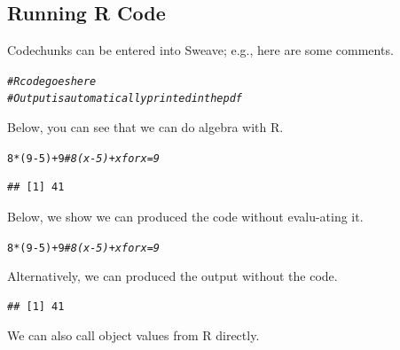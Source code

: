 \documentclass{article}\usepackage[]{graphicx}\usepackage[]{xcolor}
\makeatletter
\newcommand{\hlnum}[1]{\textcolor[rgb]{0.686,0.059,0.569}{#1}}%
\newcommand{\hlcom}[1]{\textcolor[rgb]{0.678,0.584,0.686}{\textit{#1}}}%
\newcommand{\hlopt}[1]{\textcolor[rgb]{0,0,0}{#1}}%
\newcommand{\hldef}[1]{\textcolor[rgb]{0.345,0.345,0.345}{#1}}%
\newenvironment{kframe}{%
 \def\at@end@of@kframe{}%
 \ifinner\ifhmode%
  \def\at@end@of@kframe{\end{minipage}}%
  \begin{minipage}{\columnwidth}%
 \fi\fi%
 \def\FrameCommand##1{\hskip\@totalleftmargin \hskip-\fboxsep
 \colorbox{shadecolor}{##1}\hskip-\fboxsep
     \hskip-\linewidth \hskip-\@totalleftmargin \hskip\columnwidth}%
 \MakeFramed {\advance\hsize-\width
   \@totalleftmargin\z@ \linewidth\hsize
   \@setminipage}}%
 {\par\unskip\endMakeFramed%
 \at@end@of@kframe}
\newenvironment{knitrout}{}{} %
\makeatother
\begin{document}
\begin{multicols}{2}
\subsection{Running R Code}
Codechunks can be entered into Sweave; e.g., here are some comments.
\begin{knitrout}\scriptsize
{}\color{fgcolor}\begin{kframe}
\begin{alltt}
\hlcom{# R code goes here}
\hlcom{# Output is automatically printed in the pdf}
\end{alltt}
\end{kframe}
\end{knitrout}
\indent Below, you can see that we can do algebra with R. 
\begin{knitrout}\scriptsize
{}\color{fgcolor}\begin{kframe}
\begin{alltt}
\hlnum{8}\hlopt{*}\hldef{(}\hlnum{9}\hlopt{-}\hlnum{5}\hldef{)} \hlopt{+} \hlnum{9} \hlcom{# 8(x-5) + x for x=9}
\end{alltt}
\begin{verbatim}
## [1] 41
\end{verbatim}
\end{kframe}
\end{knitrout}
\indent Below, we show we can produced the code without evalu-ating it. 
\begin{knitrout}\scriptsize
{}\color{fgcolor}\begin{kframe}
\begin{alltt}
\hlnum{8}\hlopt{*}\hldef{(}\hlnum{9}\hlopt{-}\hlnum{5}\hldef{)} \hlopt{+} \hlnum{9} \hlcom{# 8(x-5) + x for x=9}
\end{alltt}
\end{kframe}
\end{knitrout}
\indent Alternatively, we can produced the output without the code. 
\begin{knitrout}\scriptsize
{}\color{fgcolor}\begin{kframe}
\begin{verbatim}
## [1] 41
\end{verbatim}
\end{kframe}
\end{knitrout}
\indent We can also call object values from R directly. 
\begin{knitrout}\scriptsize

\end{knitrout}
\end{multicols}
\end{document}
